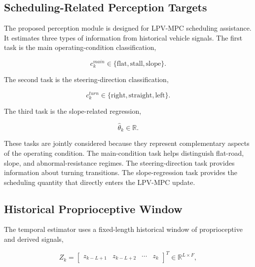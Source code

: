 \documentclass{ieeeaccess}
\begin{document}
\label{sec:temporal_perception}



\subsection{Scheduling-Related Perception Targets}



The proposed perception module is designed for LPV-MPC scheduling assistance. It estimates three types of information from historical vehicle signals. The first task is the main operating-condition classification,

\begin{equation}
c^{main}_k \in \{\mathrm{flat},\mathrm{stall},\mathrm{slope}\}.
\label{eq:main_condition}
\end{equation}

The second task is the steering-direction classification,

\begin{equation}
c^{turn}_k \in \{\mathrm{right},\mathrm{straight},\mathrm{left}\}.
\label{eq:turn_condition}
\end{equation}

The third task is the slope-related regression,

\begin{equation}
\hat{\theta}_k \in \mathbb{R}.
\label{eq:theta_regression}
\end{equation}



These tasks are jointly considered because they represent complementary aspects of the operating condition. The main-condition task helps distinguish flat-road, slope, and abnormal-resistance regimes. The steering-direction task provides information about turning transitions. The slope-regression task provides the scheduling quantity that directly enters the LPV-MPC update.



\subsection{Historical Proprioceptive Window}



The temporal estimator uses a fixed-length historical window of proprioceptive and derived signals,

\begin{equation}
Z_k =
\begin{bmatrix}
z_{k-L+1} & z_{k-L+2} & \cdots & z_k
\end{bmatrix}^{T}
\in \mathbb{R}^{L \times F},
\label{eq:input_window}
\end{equation}
\end{document}
